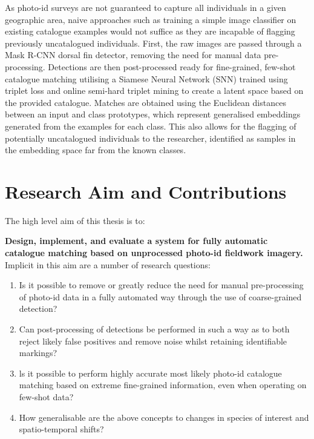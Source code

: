 As photo-id surveys are not guaranteed to capture all individuals in a given geographic area, naive approaches such as training a simple image classifier on existing catalogue examples would not suffice as they are incapable of flagging previously uncatalogued individuals. First, the raw images are passed through a Mask R-CNN \cite{he_mask_2017} dorsal fin detector, removing the need for manual data pre-processing. Detections are then post-processed ready for fine-grained, few-shot catalogue matching utilising a Siamese Neural Network (SNN) \cite{dey_signet_2017} trained using triplet loss \cite{schroff_facenet_2015} and online semi-hard triplet mining to create a latent space based on the provided catalogue. Matches are obtained using the Euclidean distances between an input and class prototypes, which represent generalised embeddings generated from the examples for each class. This also allows for the flagging of potentially uncatalogued individuals to the researcher, identified as samples in the embedding space far from the known classes.

\section{Research Aim and Contributions}\label{ch:intro,sec:AimsAndContributions}

The high level aim of this thesis is to:

\begin{flushleft}
	\textbf{Design, implement, and evaluate a system for fully automatic catalogue matching based on unprocessed photo-id fieldwork imagery.}
	\bigbreak\noindent Implicit in this aim are a number of research questions:
\end{flushleft}

\begin{enumerate}
	\item Is it possible to remove or greatly reduce the need for manual pre-processing of photo-id data in a fully automated way through the use of coarse-grained detection?
	\item Can post-processing of detections be performed in such a way as to both reject likely false positives and remove noise whilst retaining identifiable markings?
	\item ls it possible to perform highly accurate most likely photo-id catalogue matching based on extreme fine-grained information, even when operating on few-shot data?
	\item How generalisable are the above concepts to changes in species of interest and spatio-temporal shifts?
\end{enumerate}

